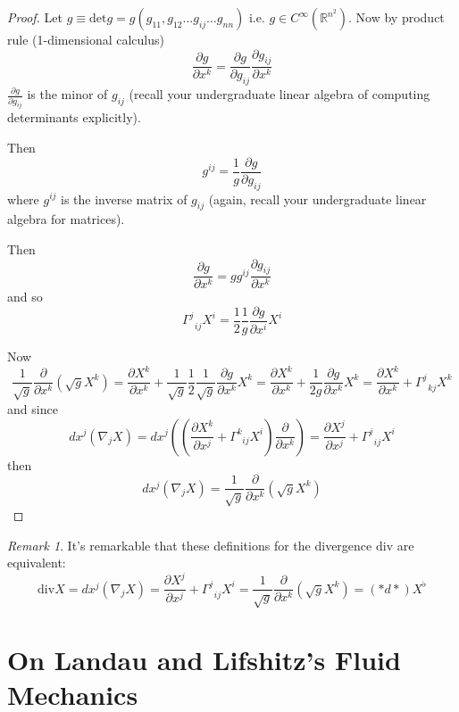 \documentclass[twoside,landscape,10pt]{amsart}
\theoremstyle{plain}
\theoremstyle{definition}
\theoremstyle{remark}
\theoremstyle{remark}
\newtheorem{remark}{Remark}
\begin{document}
\begin{multicols*}{2}
\begin{proof}
Let $g\equiv \text{det}g = g(g_{11}, g_{12} \dots g_{ij} \dots g_{nn})$ i.e. $g\in C^{\infty}(\mathbb{R}^{n^2})$.  Now by product rule (1-dimensional calculus)
\[
\frac{ \partial g}{ \partial x^k} = \frac{ \partial g}{ \partial g_{ij} } \frac{ \partial g_{ij}}{ \partial x^k}
\]
$\frac{ \partial g}{ \partial g_{ij}}$ is the minor of $g_{ij}$ (recall your undergraduate linear algebra of computing determinants explicitly).  

Then
\[
g^{ij} = \frac{1}{g} \frac{ \partial g}{ \partial g_{ij}}
\]
where $g^{ij}$ is the inverse matrix of $g_{ij}$ (again, recall your undergraduate linear algebra for matrices).  

Then
\[
\frac{ \partial g}{ \partial x^k} = gg^{ij} \frac{ \partial g_{ij}}{ \partial x^k}
\]
and so 
\[
\Gamma^j_{ \; \; ij} X^i = \frac{1}{2} \frac{1}{g} \frac{ \partial g}{ \partial x^i} X^i
\]

Now 
\[
\frac{1}{\sqrt{g}} \frac{ \partial }{ \partial x^k} (\sqrt{g} X^k)  = \frac{ \partial X^k}{ \partial x^k} + \frac{1}{\sqrt{g}} \frac{1}{2} \frac{1}{\sqrt{g}} \frac{ \partial g}{ \partial x^k} X^k = \frac{ \partial X^k}{ \partial x^k} + \frac{1}{2g} \frac{ \partial g}{ \partial x^k} X^k = \frac{ \partial X^k}{ \partial x^k} + \Gamma^j_{ \; \; kj } X^k
\]
and since
\[
dx^j( \nabla_jX) = dx^j \left( \left( \frac{ \partial X^k}{ \partial x^j} + \Gamma^k_{ \; \; ij} X^i \right) \frac{ \partial }{ \partial x^k} \right) = \frac{ \partial X^j}{ \partial x^j} + \Gamma^j_{ \; \; ij} X^i 
\]
then
\[
dx^j(\nabla_jX) = \frac{1}{\sqrt{g}} \frac{ \partial }{ \partial x^k} (\sqrt{g} X^k)
\]

\end{proof}

\begin{remark}
It's remarkable that these definitions for the divergence $\text{div}$ are equivalent:
\begin{equation}
  \boxed{ 
    \text{div}X = dx^j\left( \nabla_j X \right) = \frac{ \partial X^j}{ \partial x^j} + \Gamma^j_{ \; \; ij} X^i = \frac{1}{\sqrt{g}} \frac{ \partial }{ \partial x^k} (\sqrt{g} X^k) = (*d*)X^{\flat}
    }
\end{equation}
\end{remark}

\part{On Landau and Lifshitz's \textbf{Fluid Mechanics}}\cite{LLandauELifshitz1987}


\end{multicols*}
\end{document}
